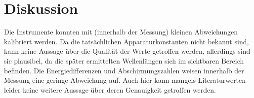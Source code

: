 \section{Diskussion}
\label{sec:Diskussion}

Die Instrumente konnten mit (innerhalb der Messung) kleinen Abweichungen kalibriert werden. Da die tatsächlichen Apparaturkonstanten nicht bekannt sind, kann keine Aussage über die Qualität der Werte getroffen werden, allerdings sind sie plausibel, da die später ermittelten Wellenlängen sich im sichtbaren Bereich befinden. Die Energiedifferenzen und Abschirmungszahlen weisen innerhalb der Messung eine geringe Abweichung auf. Auch hier kann mangels Literaturwerten leider keine weitere Aussage über deren Genauigkeit getroffen werden.
